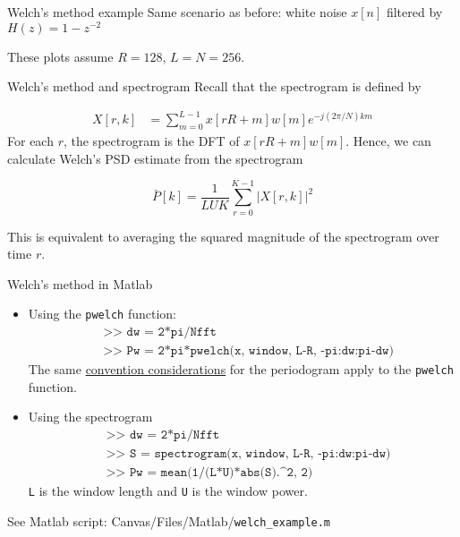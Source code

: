 \documentclass[10pt]{beamer}
\begin{document}
%
\begin{frame}{Welch's method example}
Same scenario as before: white noise $x[n]$ filtered by $H(z) = 1 - z^{-2}$

These plots assume $R = 128$, $L = N = 256$.
\begin{center}
	\resizebox{0.9\textwidth}{!}{}
\end{center}
\end{frame}

%
\begin{frame}{Welch's method and spectrogram}
Recall that the spectrogram is defined by

\begin{align*}
	X[r, k] &= \sum_{m = 0}^{L-1}x[rR+m]w[m]e^{-j(2\pi/N)km} \tag{spectrogram}
\end{align*}
For each $r$, the spectrogram is the DFT of $x[rR+m]w[m]$. Hence, we can calculate Welch's PSD estimate from the spectrogram

\begin{equation*}
	\bar{P}[k] = \frac{1}{LUK} \sum_{r = 0}^{K-1} |X[r, k]|^2 \tag{Welch's PSD estimate}
\end{equation*}

This is equivalent to averaging the squared magnitude of the spectrogram over time $r$.

\end{frame}

%
\begin{frame}{Welch's method in Matlab}
\begin{itemize}
	\item Using the \texttt{pwelch} function:
	\begin{align*}
	& \texttt{>> dw = 2*pi/Nfft} \\
	& \texttt{>> Pw = 2*pi*pwelch(x, window, L-R, -pi:dw:pi-dw)} \tag{two-sided PSD estimate}
	\end{align*}
	The same \underline{convention considerations} for the periodogram apply to the \texttt{pwelch} function.
	
	\item Using the spectrogram
	\begin{align*}
		& \texttt{>> dw = 2*pi/Nfft} \\
		& \texttt{>> S = spectrogram(x, window, L-R, -pi:dw:pi-dw)}\\
		& \texttt{>> Pw = mean(1/(L*U)*abs(S).\textasciicircum 2, 2)} \tag{two-sided PSD estimate}
	\end{align*}
	\texttt{L} is the window length and \texttt{U} is the window power.
\end{itemize}

\vspace{0.25cm}
See Matlab script: Canvas/Files/Matlab/\texttt{welch\_example.m}
\end{frame}
\end{document}
